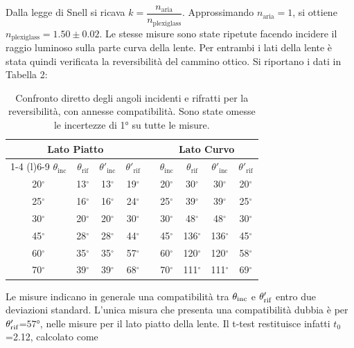 Dalla legge di Snell si ricava $k=\dfrac{n_{\text{aria}}}{n_{\text{plexiglass}}}$. 
Approssimando $n_{\text{aria}}=1$, si ottiene\\ $n_{\text{plexiglass}}=1.50 \pm 0.02 \label{misura-1}$.
\newpage
Le stesse misure sono state ripetute facendo incidere il raggio luminoso sulla parte curva della lente.
Per entrambi i lati della lente è stata quindi verificata la reversibilità del cammino ottico. Si riportano i dati in Tabella 2:\\

\begin{table}[htbp]
\centering

\begin{tabular}{cccc c cccc}
\toprule
\multicolumn{4}{c}{\textbf{Lato Piatto}} & & \multicolumn{4}{c}{\textbf{Lato Curvo}} \\
\cmidrule(r){1-4} \cmidrule(l){6-9}
$\theta_{\text{inc}}$ & $\theta_{\text{rif}}$ & $\theta'_{\text{inc}}$ & $\theta'_{\text{rif}}$ & & $\theta_{\text{inc}}$ & $\theta_{\text{rif}}$ & $\theta'_{\text{inc}}$ & $\theta'_{\text{rif}}$ \\
\midrule
20$^\circ$ & 13$^\circ$ & 13$^\circ$ & 19$^\circ$ & & 20$^\circ$ & 30$^\circ$  & 30$^\circ$  & 20$^\circ$ \\
25$^\circ$ & 16$^\circ$ & 16$^\circ$ & 24$^\circ$ & & 25$^\circ$ & 39$^\circ$  & 39$^\circ$  & 25$^\circ$ \\
30$^\circ$ & 20$^\circ$ & 20$^\circ$ & 30$^\circ$ & & 30$^\circ$ & 48$^\circ$  & 48$^\circ$  & 30$^\circ$ \\
45$^\circ$ & 28$^\circ$ & 28$^\circ$ & 44$^\circ$ & & 45$^\circ$ & 136$^\circ$ & 136$^\circ$ & 45$^\circ$ \\
60$^\circ$ & 35$^\circ$ & 35$^\circ$ & 57$^\circ$ & & 60$^\circ$ & 120$^\circ$ & 120$^\circ$ & 58$^\circ$ \\
70$^\circ$ & 39$^\circ$ & 39$^\circ$ & 68$^\circ$ & & 70$^\circ$ & 111$^\circ$ & 111$^\circ$ & 69$^\circ$ \\
\bottomrule
\end{tabular}
\caption{Confronto diretto degli angoli incidenti e rifratti per la reversibilità, con annesse compatibilità. Sono state omesse le incertezze di \ang{1} su tutte le misure.}
\label{tab:confronto_diretto}
\end{table}
Le misure indicano in generale una compatibilità tra $\theta_{\text{\text{inc}}}$ e $\theta'_{\text{\text{rif}}}$ entro due deviazioni standard. L'unica misura che presenta una compatibilità dubbia è per $\theta'_{\text{\text{rif}}}$=$\ang{57}$, nelle misure per il lato piatto della lente. Il t-test restituisce infatti $t_0$=2.12, calcolato come 

